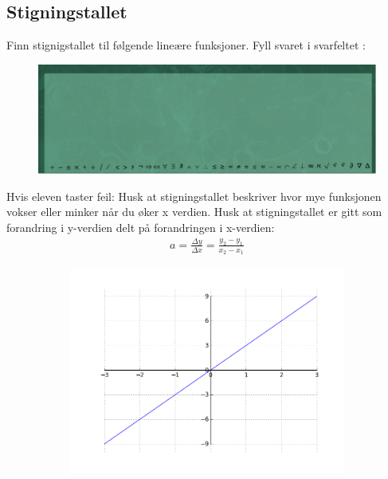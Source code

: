 \documentclass[12pt,twoside,onecolumn]{article}
\begin{document}
\subsection*{Stigningstallet}

\begin{Exercise}
Finn stignigstallet til følgende lineære funksjoner. Fyll svaret i svarfeltet :
\begin{figure}[h!]
\centering
\includegraphics[scale = 0.3]{figures/Svarfelt.png}
\label{fig:grid}
\end{figure}
{\color{Maroon}Hvis eleven taster feil:} Husk at stigningstallet beskriver hvor mye funksjonen vokser eller minker når du øker x verdien. Husk at stigningstallet er gitt som forandring i y-verdien delt på forandringen i x-verdien:
\begin{align}
a = \frac{\Delta y}{\Delta x} = \frac{y_2 - y_1}{x_2 - x_1}
\end{align}
\begin{figure}[h!]
\centering
    \begin{subfigure}{.5\textwidth}
    \centering
    \includegraphics[scale = 0.5]{figures/3X.png}

\end{subfigure}
\end{figure}
\end{Exercise}
\end{document}
